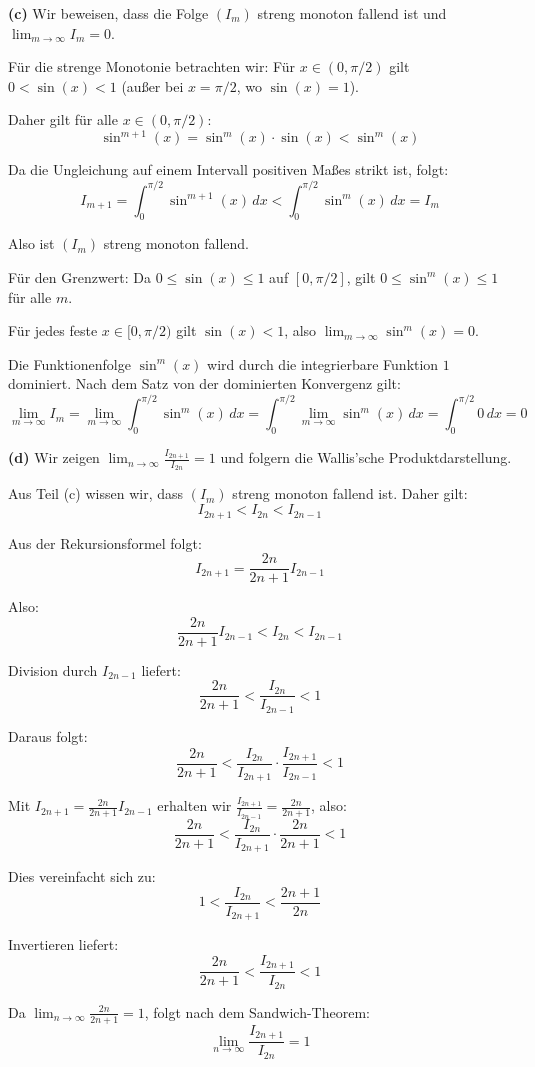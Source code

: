 \documentclass{article}
\begin{document}
\textbf{(c)} Wir beweisen, dass die Folge $(I_m)$ streng monoton fallend ist und $\lim_{m\to\infty}I_m=0$.

Für die strenge Monotonie betrachten wir: Für $x \in (0, \pi/2)$ gilt $0 < \sin(x) < 1$ (außer bei $x = \pi/2$, wo $\sin(x) = 1$).

Daher gilt für alle $x \in (0, \pi/2)$:
$$\sin^{m+1}(x) = \sin^m(x) \cdot \sin(x) < \sin^m(x)$$

Da die Ungleichung auf einem Intervall positiven Maßes strikt ist, folgt:
$$I_{m+1} = \int_0^{\pi/2} \sin^{m+1}(x) \, dx < \int_0^{\pi/2} \sin^m(x) \, dx = I_m$$

Also ist $(I_m)$ streng monoton fallend.

Für den Grenzwert: Da $0 \leq \sin(x) \leq 1$ auf $[0, \pi/2]$, gilt $0 \leq \sin^m(x) \leq 1$ für alle $m$.

Für jedes feste $x \in [0, \pi/2)$ gilt $\sin(x) < 1$, also $\lim_{m\to\infty} \sin^m(x) = 0$.

Die Funktionenfolge $\sin^m(x)$ wird durch die integrierbare Funktion $1$ dominiert. Nach dem Satz von der dominierten Konvergenz gilt:
$$\lim_{m\to\infty} I_m = \lim_{m\to\infty} \int_0^{\pi/2} \sin^m(x) \, dx = \int_0^{\pi/2} \lim_{m\to\infty} \sin^m(x) \, dx = \int_0^{\pi/2} 0 \, dx = 0$$

\textbf{(d)} Wir zeigen $\lim_{n\to\infty}\frac{I_{2n+1}}{I_{2n}}=1$ und folgern die Wallis'sche Produktdarstellung.

Aus Teil (c) wissen wir, dass $(I_m)$ streng monoton fallend ist. Daher gilt:
$$I_{2n+1} < I_{2n} < I_{2n-1}$$

Aus der Rekursionsformel folgt:
$$I_{2n+1} = \frac{2n}{2n+1} I_{2n-1}$$

Also:
$$\frac{2n}{2n+1} I_{2n-1} < I_{2n} < I_{2n-1}$$

Division durch $I_{2n-1}$ liefert:
$$\frac{2n}{2n+1} < \frac{I_{2n}}{I_{2n-1}} < 1$$

Daraus folgt:
$$\frac{2n}{2n+1} < \frac{I_{2n}}{I_{2n+1}} \cdot \frac{I_{2n+1}}{I_{2n-1}} < 1$$

Mit $I_{2n+1} = \frac{2n}{2n+1} I_{2n-1}$ erhalten wir $\frac{I_{2n+1}}{I_{2n-1}} = \frac{2n}{2n+1}$, also:
$$\frac{2n}{2n+1} < \frac{I_{2n}}{I_{2n+1}} \cdot \frac{2n}{2n+1} < 1$$

Dies vereinfacht sich zu:
$$1 < \frac{I_{2n}}{I_{2n+1}} < \frac{2n+1}{2n}$$

Invertieren liefert:
$$\frac{2n}{2n+1} < \frac{I_{2n+1}}{I_{2n}} < 1$$

Da $\lim_{n\to\infty} \frac{2n}{2n+1} = 1$, folgt nach dem Sandwich-Theorem:
$$\lim_{n\to\infty} \frac{I_{2n+1}}{I_{2n}} = 1$$
\end{document}

